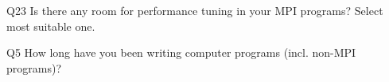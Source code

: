 \begin{description}%
\item{Q23} Is there any room for performance tuning in your MPI programs? Select most suitable one.%
\item{Q5} How long have you been writing computer programs (incl. non-MPI programs)?%
\end{description}%
